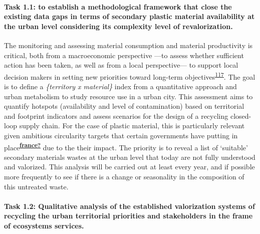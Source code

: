 \documentclass[
  12pt,
  a4paperpaper,
  onecolumn]{article}
\let\oldparagraph\paragraph
\renewcommand{\paragraph}[1]{\oldparagraph{#1}\mbox{}}
\let\paragraph\oldparagraph
\begin{document}
\hypertarget{task-1.1-to-establish-a-methodological-framework-that-close-the-existing-data-gaps-in-terms-of-secondary-plastic-material-availability-at-the-urban-level-considering-its-complexity-level-of-revalorization.}{%
\paragraph{Task 1.1: to establish a methodological framework that close
the existing data gaps in terms of secondary plastic material
availability at the urban level considering its complexity level of
revalorization.}\label{task-1.1-to-establish-a-methodological-framework-that-close-the-existing-data-gaps-in-terms-of-secondary-plastic-material-availability-at-the-urban-level-considering-its-complexity-level-of-revalorization.}}

The monitoring and assessing material consumption and material
productivity is critical, both from a macroeconomic perspective ---to
assess whether sufficient action has been taken, as well as from a local
perspective--- to support local decision makers in setting new
priorities toward long-term
objectives\textsuperscript{\protect\hyperlink{ref-Bianchi2020}{117}}.
The goal is to define a \emph{\{territory x material\}} index from a
quantitative approach and urban metabolism to study resource use in a
urban city. This assessment aims to quantify hotspots (availability and
level of contamination) based on territorial and footprint indicators
and assess scenarios for the design of a recycling closed-loop supply
chain. For the case of plastic material, this is particularly relevant
given ambitious circularity targets that certain governments have
putting in
place\textsuperscript{\protect\hyperlink{ref-france}{\textbf{france?}}}
due to the their impact. The priority is to reveal a list of `suitable'
secondary materials wastes at the urban level that today are not fully
understood and valorized. This analysis will be carried out at least
every year, and if possible more frequently to see if there is a change
or seasonality in the composition of this untreated waste.

\hypertarget{task-1.2-qualitative-analysis-of-the-established-valorization-systems-of-recycling-the-urban-territorial-priorities-and-stakeholders-in-the-frame-of-ecosystems-services.}{%
\paragraph{Task 1.2: Qualitative analysis of the established
valorization systems of recycling the urban territorial priorities and
stakeholders in the frame of ecosystems
services.}\label{task-1.2-qualitative-analysis-of-the-established-valorization-systems-of-recycling-the-urban-territorial-priorities-and-stakeholders-in-the-frame-of-ecosystems-services.}}
\end{document}
